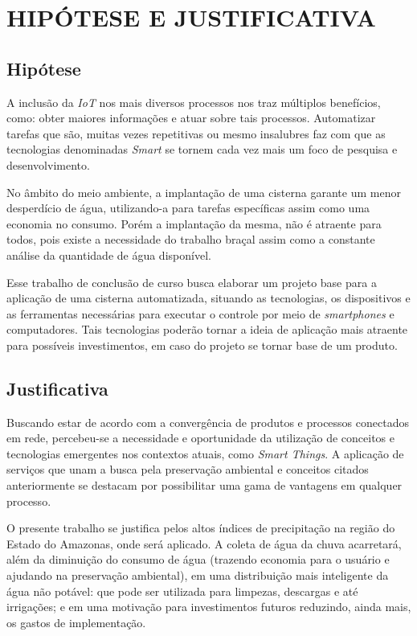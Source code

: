 
\chapter{HIPÓTESE E JUSTIFICATIVA}
\label{chap:hipoteseejustificativa}

\section{Hipótese}
\label{sec:hipotese}

A inclusão da \textit{IoT} nos mais diversos processos nos traz múltiplos benefícios, como: obter maiores informações e atuar sobre tais processos. Automatizar tarefas que são, muitas vezes repetitivas ou mesmo insalubres faz com que as tecnologias denominadas \textit{Smart} se tornem cada vez mais um foco de pesquisa e desenvolvimento. 

No âmbito do meio ambiente, a implantação de uma cisterna garante um menor desperdício de água, utilizando-a para tarefas específicas assim como uma economia no consumo. Porém a implantação da mesma, não é atraente para todos, pois existe a necessidade do trabalho braçal assim como a constante análise da quantidade de água disponível.

Esse trabalho de conclusão de curso busca elaborar um projeto base para a aplicação de uma cisterna automatizada, situando as tecnologias, os dispositivos e as ferramentas necessárias para executar o controle por meio de \textit{smartphones} e computadores. Tais tecnologias poderão tornar a ideia de aplicação mais atraente para possíveis investimentos, em caso do projeto se tornar base de um produto.



\section{Justificativa}
\label{sec:justificativa}

Buscando estar de acordo com a convergência de produtos e processos conectados em rede, percebeu-se a necessidade e oportunidade da utilização de conceitos e tecnologias emergentes nos contextos atuais, como \textit{Smart Things}. A aplicação de serviços que unam a busca pela preservação ambiental e conceitos citados anteriormente se destacam por possibilitar uma gama de vantagens em qualquer processo.

O presente trabalho se justifica pelos altos índices de precipitação na região do Estado do Amazonas, onde será aplicado. A coleta de água da chuva acarretará, além da diminuição do consumo de água (trazendo economia para o usuário e ajudando na preservação ambiental), em uma distribuição mais inteligente da água não potável: que pode ser utilizada para limpezas, descargas e até irrigações; e em uma motivação para investimentos futuros reduzindo, ainda mais, os gastos de implementação.


